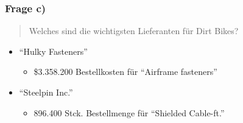 \documentclass{beamer}
\begin{document}
\begin{frame}
\frametitle{Frage c)}

\begin{quote}
Welches sind die wichtigsten Lieferanten für Dirt Bikes?
\end{quote}

\begin{itemize}
\setlength{\itemsep}{14pt}
\item ``Hulky Fasteners''
\begin{itemize}
\item \$3.358.200 Bestellkosten f\"ur ``Airframe fasteners''
\end{itemize}
\item ``Steelpin Inc.''
\begin{itemize}
\item 896.400 Stck. Bestellmenge f\"ur ``Shielded Cable-ft.''
\end{itemize}
\end{itemize}

\end{frame}
\end{document}
